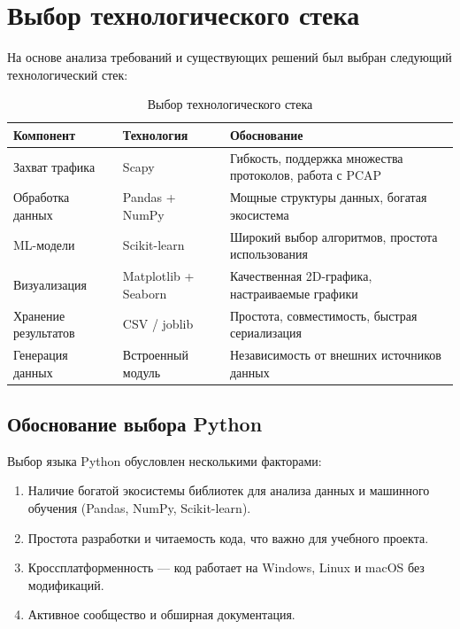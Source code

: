 \section{Выбор технологического стека}

На основе анализа требований и существующих решений был выбран следующий технологический стек:

\begin{table}[H]
\centering
\caption{Выбор технологического стека}
\label{tab:tech}
\begin{tabular}{p{3.5cm}p{3cm}p{8cm}}
\toprule
\textbf{Компонент} & \textbf{Технология} & \textbf{Обоснование} \\
\midrule
Захват трафика & Scapy & Гибкость, поддержка множества протоколов, работа с PCAP \\
Обработка данных & Pandas + NumPy & Мощные структуры данных, богатая экосистема \\
ML-модели & Scikit-learn & Широкий выбор алгоритмов, простота использования \\
Визуализация & Matplotlib + Seaborn & Качественная 2D-графика, настраиваемые графики \\
Хранение результатов & CSV / joblib & Простота, совместимость, быстрая сериализация \\
Генерация данных & Встроенный модуль & Независимость от внешних источников данных \\
\bottomrule
\end{tabular}
\end{table}

\subsection{Обоснование выбора Python}

Выбор языка Python обусловлен несколькими факторами:
\begin{enumerate}
    \item Наличие богатой экосистемы библиотек для анализа данных и машинного обучения (Pandas, NumPy, Scikit-learn).
    \item Простота разработки и читаемость кода, что важно для учебного проекта.
    \item Кроссплатформенность — код работает на Windows, Linux и macOS без модификаций.
    \item Активное сообщество и обширная документация.
\end{enumerate}
